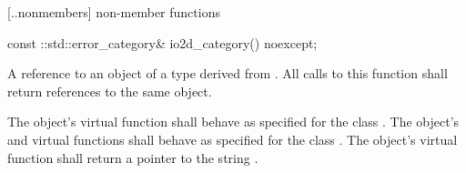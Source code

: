  [\iotwod.\iotwoderrorcategory.nonmembers] { 
non-member functions}

%
\begin{itemdecl}
  const ::std::error_category& io2d_category() noexcept;
\end{itemdecl}
\begin{itemdescr}
	\pnum
	\returns
	A reference to an object of a type derived from . All 
	calls to this function shall return references to the same object.
	
	\pnum
	\remarks
	The object's  virtual function shall behave 
	as specified for the class . The object's 
	 and  
	virtual functions shall behave as specified for the class 
	. The object's  virtual function 
	shall return a pointer to the string .
\end{itemdescr}
